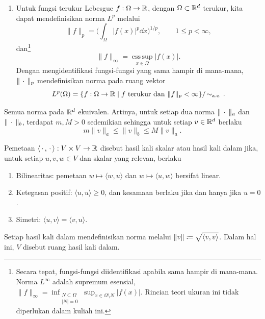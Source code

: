 \begin{example}
\begin{enumerate}
        \item Untuk fungsi terukur Lebesgue $f:\Omega\rightarrow\mathbb{R}$, dengan
        $\Omega\subset\mathbb{R}^d$ terukur, kita
        dapat mendefinisikan norma $L^p$ melalui
        \begin{equation}
            \|f\|_p=\bigg(\int_\Omega|f(x)|^p\dd x\bigg)^{1/p},
            \qquad 1\leq p<\infty,
        \end{equation}
        dan\footnote{Secara tepat, fungsi-fungsi diidentifikasi apabila sama
        hampir di mana-mana. Norma $L^\infty$ adalah supremum esensial,
        $\|f\|_\infty=\inf_{\substack{N\subset\Omega\\|N|=0}}
        \sup_{x\in\Omega\setminus N}|f(x)|$. Rincian teori ukuran ini tidak
        diperlukan dalam kuliah ini.}
        \begin{equation}
            \|f\|_\infty=\operatorname*{ess\,sup}_{x\in\Omega}|f(x)|.
        \end{equation}
        Dengan mengidentifikasi fungsi-fungsi yang sama hampir di mana-mana,
        $\|\,\cdot\,\|_p$ mendefinisikan norma pada ruang vektor
        \begin{equation}
            L^p(\Omega)=
            \{f:\Omega\rightarrow\mathbb{R}\mid f\text{ terukur dan }\|f\|_p<\infty\}
            /\!\sim_{\mathrm{a.e.}}.
        \end{equation}
    \end{enumerate}
\end{example}

\begin{theorem}
    Semua norma pada $\mathbb{R}^d$ ekuivalen. Artinya, untuk setiap dua norma
    $\|\,\cdot\,\|_a$ dan $\|\,\cdot\,\|_b$, terdapat $m,M>0$ sedemikian
    sehingga untuk setiap $v\in\mathbb{R}^d$ berlaku
    \begin{equation}
        m\|v\|_a\leq\|v\|_b\leq M\|v\|_a.
    \end{equation}
\end{theorem}

\begin{defn}
    Pemetaan $\langle\,\cdot\,,\,\cdot\,\rangle:V\times V\rightarrow\mathbb{R}$
    disebut hasil kali skalar atau hasil kali dalam jika, untuk setiap
    $u,v,w\in V$ dan skalar yang relevan, berlaku
    \begin{enumerate}
        \item Bilinearitas: pemetaan $w\mapsto\langle w,u\rangle$ dan
        $w\mapsto\langle u,w\rangle$ bersifat linear.
        \item Ketegasan positif: $\langle u,u\rangle\geq0$, dan kesamaan berlaku
        jika dan hanya jika $u=0$.
        \item Simetri: $\langle u,v\rangle=\langle v,u\rangle$.
    \end{enumerate}
    Setiap hasil kali dalam mendefinisikan norma melalui
    $\|v\|\coloneq\sqrt{\left\langle v , v\right\rangle}$. Dalam hal ini, $V$ disebut ruang hasil
    kali dalam.
\end{defn}

